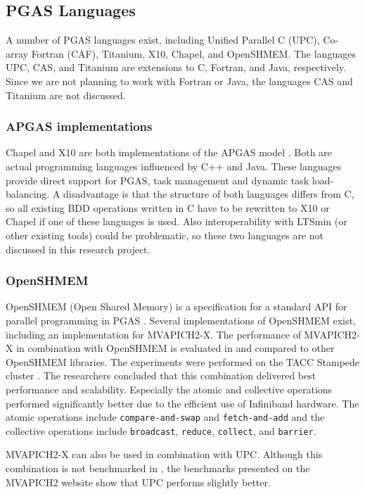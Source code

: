 \subsection{PGAS Languages}
A number of PGAS languages exist, including Unified Parallel C (UPC), Co-array Fortran (CAF), Titanium, X10, Chapel, and OpenSHMEM. The languages UPC, CAS, and Titanium are extensions to C, Fortran, and Java, respectively. Since we are not planning to work with Fortran or Java, the languages CAS and Titanium are not discussed. 

\subsubsection{APGAS implementations}
Chapel and X10 are both implementations of the APGAS model \cite{Chamberlain:2007:PPC:1286120.1286123, Charles:2005:XOA:1103845.1094852}. Both are actual programming languages influenced by C++ and Java. These languages provide direct support for PGAS, task management and dynamic task load-balancing. A disadvantage is that the structure of both languages differs from C, so all existing BDD operations written in C have to be rewritten to X10 or Chapel if one of these languages is used. Also interoperability with LTSmin (or other existing tools) could be problematic, so these two languages are not discussed in this research project.

\subsubsection{OpenSHMEM}
OpenSHMEM (Open Shared Memory) is a specification for a standard API for parallel programming in PGAS \cite{openshmem}. Several implementations of OpenSHMEM exist, including an implementation for MVAPICH2-X. The performance of MVAPICH2-X in combination with OpenSHMEM is evaluated in \cite{openshmem_perf_evaluation} and compared to other OpenSHMEM libraries. The experiments were performed on the TACC Stampede cluster \cite{stampede_cluster}. The researchers concluded that this combination delivered best performance and scalability. Especially the atomic and collective operations performed significantly better due to the efficient use of Infiniband hardware. The atomic operations include \texttt{compare-and-swap} and \texttt{fetch-and-add} and the collective operations include \texttt{broadcast}, \texttt{reduce}, \texttt{collect}, and \texttt{barrier}. 

MVAPICH2-X can also be used in combination with UPC. Although this combination is not benchmarked in \cite{openshmem_perf_evaluation}, the benchmarks presented on the MVAPICH2 website show that UPC performs slightly better.

